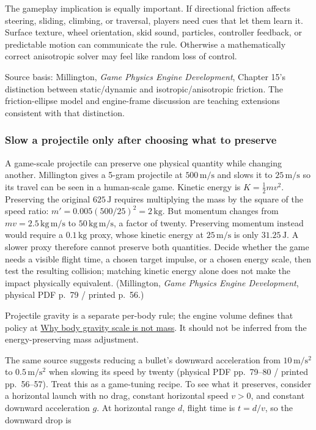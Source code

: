 The gameplay implication is equally important. If directional friction affects steering, sliding, climbing, or traversal, players need cues that let them learn it. Surface texture, wheel orientation, skid sound, particles, controller feedback, or predictable motion can communicate the rule. Otherwise a mathematically correct anisotropic solver may feel like random loss of control.

Source basis: Millington, \emph{Game Physics Engine Development}, Chapter 15's distinction between static/dynamic and isotropic/anisotropic friction. The friction-ellipse model and engine-frame discussion are teaching extensions consistent with that distinction.

\subsubsection{Slow a projectile only after choosing what to preserve}\label{slow-a-projectile-only-after-choosing-what-to-preserve}

A game-scale projectile can preserve one physical quantity while changing another. Millington gives a 5-gram projectile at \(500\,\mathrm{m/s}\) and slows it to \(25\,\mathrm{m/s}\) so its travel can be seen in a human-scale game. Kinetic energy is \(K=\tfrac12mv^2\). Preserving the original \(625\,\mathrm J\) requires multiplying the mass by the square of the speed ratio: \(m'=0.005(500/25)^2=2\,\mathrm{kg}\). But momentum changes from \(mv=2.5\,\mathrm{kg\,m/s}\) to \(50\,\mathrm{kg\,m/s}\), a factor of twenty. Preserving momentum instead would require a \(0.1\,\mathrm{kg}\) proxy, whose kinetic energy at \(25\,\mathrm{m/s}\) is only \(31.25\,\mathrm J\). A slower proxy therefore cannot preserve both quantities. Decide whether the game needs a visible flight time, a chosen target impulse, or a chosen energy scale, then test the resulting collision; matching kinetic energy alone does not make the impact physically equivalent. (Millington, \emph{Game Physics Engine Development}, physical PDF p.~79 / printed p.~56.)

Projectile gravity is a separate per-body rule; the engine volume defines that policy at \hyperref[06-engine-ii-ch038]{Why body gravity scale is not mass}. It should not be inferred from the energy-preserving mass adjustment.

The same source suggests reducing a bullet's downward acceleration from \(10\,\mathrm{m/s^2}\) to \(0.5\,\mathrm{m/s^2}\) when slowing its speed by twenty (physical PDF pp.~79--80 / printed pp.~56--57). Treat this as a game-tuning recipe. To see what it preserves, consider a horizontal launch with no drag, constant horizontal speed \(v>0\), and constant downward acceleration \(g\). At horizontal range \(d\), flight time is \(t=d/v\), so the downward drop is

